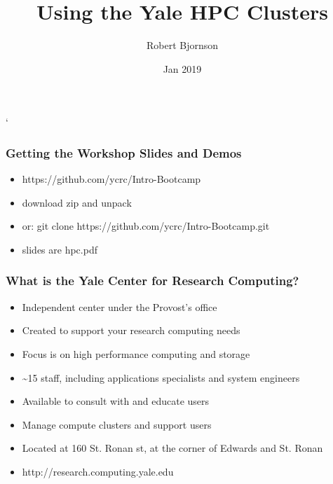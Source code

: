 \documentclass[10pt]{beamer}
\begin{document}
\title{Using the Yale HPC Clusters}`
\author{{Robert Bjornson}}
\date{Jan 2019}

\begin{frame}[plain]
  \titlepage
\end{frame}

\begin{frame}[fragile]
\frametitle{Getting the Workshop Slides and Demos}
\begin{itemize}
\item https://github.com/ycrc/Intro-Bootcamp
\item download zip and unpack
\item or: git clone https://github.com/ycrc/Intro-Bootcamp.git
\item slides are hpc.pdf
\end{itemize}
\end{frame}

\begin{frame}[fragile]
\frametitle{What is the Yale Center for Research Computing?}

\begin{itemize}
\item Independent center under the Provost's office
\item Created to support your research computing needs
\item Focus is on high performance computing and storage
\item \textasciitilde 15 staff, including applications specialists and system engineers
\item Available to consult with and educate users
\item Manage compute clusters and support users
\item Located at 160 St. Ronan st, at the corner of Edwards and St. Ronan
\item http://research.computing.yale.edu
\end{itemize}

\end{frame}
\end{document}
